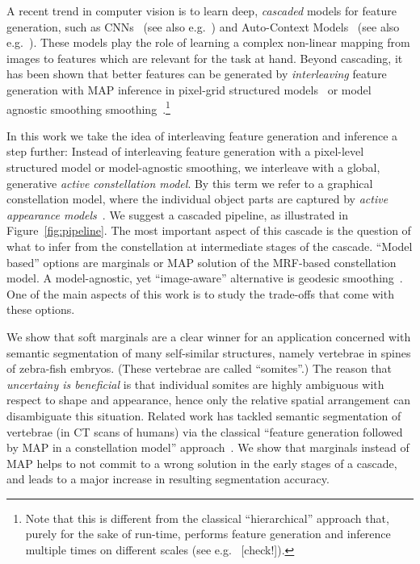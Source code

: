 \documentclass[10pt,twocolumn,letterpaper]{article}
\begin{document}
A recent trend in computer vision is to learn deep, \emph{cascaded} models for feature generation, such as CNNs~\cite{NIPS2012_4824} (see also e.g.\ \cite{funke2014candidate}) and Auto-Context Models~\cite{AutoContext2008} (see also e.g.\ \cite{PoseMachinesECCV2014}). 
%
These models play the role of learning a complex non-linear mapping from images to features which are relevant for the task at hand. 
%
Beyond cascading, it has been shown that better features can be generated by \emph{interleaving} feature generation with MAP inference in pixel-grid structured models~\cite{DTF,RTF,UweCVPR2013} 
%
or model agnostic smoothing smoothing~\cite{GeoForests2013}.\footnote{Note that this is different from the classical "`hierarchical"' approach that, purely for the sake of run-time, performs feature generation and inference multiple times on different scales (see e.g.\ \cite{CootesECCV2012RRFandSSM,CootesFemurTMI2013} [check!]).}

In this work we take the idea of interleaving feature generation and inference a step further: 
%
Instead of interleaving feature generation with a pixel-level structured model or model-agnostic smoothing, we interleave with a global, generative \emph{active constellation model}. By this term we refer to a graphical constellation model, where the individual object parts are captured by \emph{active appearance models}~\cite{CootesAAM2001}. 
%
We suggest a cascaded pipeline, as illustrated in Figure~\ref{fig:pipeline}. 
% 
The most important aspect of this cascade is the question of what to infer from the constellation at intermediate stages of the cascade. 
%
"`Model based"' options are marginals or MAP solution of the MRF-based constellation model. A model-agnostic, yet "`image-aware"' alternative is geodesic smoothing~\cite{GeoForests2013}. 
%
One of the main aspects of this work is to study the trade-offs that come with these options. 

We show that soft marginals are a clear winner for an application concerned with semantic segmentation of many self-similar structures, namely vertebrae in spines of zebra-fish embryos. 
%
(These vertebrae are called "`somites"'.) 
%
The reason that \emph{uncertainy is beneficial} is that individual somites are highly ambiguous with respect to shape and appearance, hence only the relative spatial arrangement can disambiguate this situation. 
%
Related work has tackled semantic segmentation of vertebrae (in CT scans of humans) via the classical "`feature generation followed by MAP in a constellation model"' approach~\cite{Glocker2013}.
%
We show that marginals instead of MAP helps to not commit to a wrong solution in the early stages of a cascade, and leads to a major increase in resulting segmentation accuracy. 
\end{document}

